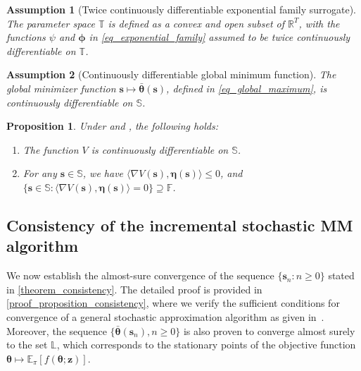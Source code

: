 \documentclass{article}
\def\phib        {{\sbmm{\phi}}\XS}        \def\Phib       {{\sbmm{\Phi}}\XS}
\def\XS{\xspace}
\def\sbmm#1{\ensuremath{\boldsymbol{#1}}}
\newtheorem{assumption}{Assumption}
\newtheorem{proposition}{Proposition}
\def\rset{\mathbb{R}}
\def\PE{\mathbb{E}_\pi} %
\def\param{\vtheta}
\def\barparam{\bar{\param}}
\def\lyap{V}
\def\rvz{{\mathbf{z}}}
\def\veta{{\bm{\eta}}}
\def\vtheta{{\bm{\theta}}}
\def\vs{{\bm{s}}}
\def\sF{{\mathbb{F}}}
\def\sL{{\mathbb{L}}}
\def\sS{{\mathbb{S}}}
\def\sT{{\mathbb{T}}}
\begin{document}
\begin{assumption}[Twice continuously differentiable exponential family surrogate]\label{assumptionA5}
The parameter space $\sT$ is defined as a convex and open subset of $\rset^T$, with the functions $\psi$ and $\phib$ in \cref{eq_exponential_family} assumed to be twice continuously differentiable on $\sT$.
\end{assumption}
\begin{assumption}[Continuously differentiable global minimum function]\label{assumptionA6}
The global minimizer function $\vs \mapsto \barparam(\vs)$, defined in \cref{eq_global_maximum}, is continuously differentiable on $\sS$. 
\end{assumption}
\begin{proposition}\label{prop_Lyapunov_function}
Under  and , the following holds:
\begin{enumerate}
    \item[(a)]  The function $V$ is continuously differentiable on $\sS$.

    \item[(b)] For any $\vs \in \sS$, we have $\langle \nabla\lyap(\vs), \veta(\vs)\rangle \le 0$, and $
        \{\vs \in \sS : \langle \nabla\lyap(\vs), \veta(\vs)\rangle = 0\} \supseteq \sF$.
\end{enumerate}
\end{proposition}


\subsection{Consistency of the incremental stochastic MM algorithm}
We now establish the almost-sure convergence of the sequence $\{\vs_n : n \ge 0\}$ stated in \cref{theorem_consistency}. The detailed proof is provided in \cref{proof_proposition_consistency}, where we verify the sufficient conditions for convergence of a general stochastic approximation algorithm as given in~\cite{andrieu_stability_2005}. Moreover, the sequence $\{\barparam(\vs_n), n \geq 0\}$ is also proven to converge almost surely to the set $\sL$, which corresponds to the stationary points of the objective function $\vtheta \mapsto \PE\left[f(\vtheta; \rvz)\right]$.
\end{document}
